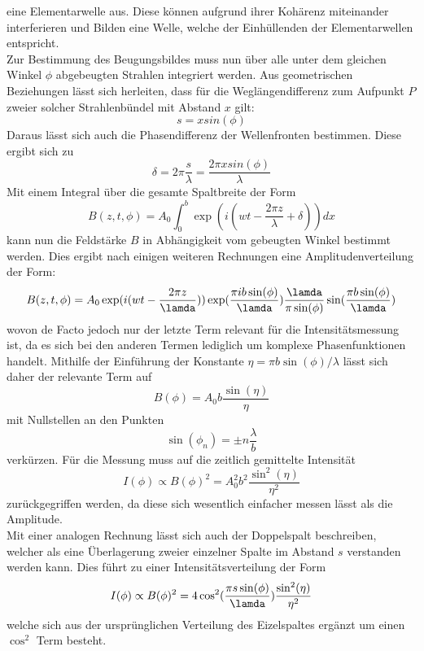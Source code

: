 eine Elementarwelle aus. Diese können aufgrund ihrer Kohärenz miteinander interferieren und Bilden eine Welle, welche der Einhüllenden der Elementarwellen 
entspricht. \\ Zur Bestimmung des Beugungsbildes muss nun über alle unter dem gleichen Winkel $\phi$ abgebeugten Strahlen 
integriert werden. Aus geometrischen Beziehungen lässt sich herleiten, dass für die Weglängendifferenz zum Aufpunkt $P$ zweier solcher Strahlenbündel mit Abstand $x$ gilt:
\begin{equation}
s=xsin(\phi)
\end{equation}
Daraus lässt sich auch die Phasendifferenz der Wellenfronten bestimmen. Diese ergibt sich zu
\begin{equation}
\delta=2\pi\frac{s}{\lambda}=\frac{2\pi xsin(\phi)}{\lambda}
\end{equation}
Mit einem Integral über die gesamte Spaltbreite der Form
\begin{equation}
B(z,t,\phi)=A_0 \int_{0}^{b} \exp(i(wt-\frac{2\pi z}{\lambda}+\delta))dx
\end{equation}
kann nun die Feldstärke $B$ in Abhängigkeit vom gebeugten Winkel bestimmt werden. Dies ergibt nach einigen weiteren Rechnungen eine 
Amplitudenverteilung der Form:
\begin{equation}
B(z,t,\phi)=A_0\exp(i(wt-\frac{2\pi z}{\lamda}))\exp(\frac{\pi ib\sin(\phi)}{\lamda})\frac{\lamda}{\pi \sin(\phi)}\sin(\frac{\pi b\sin(\phi)}{\lamda})
\end{equation}
wovon de Facto jedoch nur der letzte Term relevant für die Intensitätsmessung ist, da es sich bei den anderen
Termen lediglich um komplexe Phasenfunktionen handelt. Mithilfe der Einführung der Konstante $\eta=\pi b\sin(\phi)/\lambda$
lässt sich daher der relevante Term auf 
\begin{equation}
B(\phi)=A_0b\frac{\sin(\eta)}{\eta}
\end{equation}
mit Nullstellen an den Punkten
\begin{equation}
\sin(\phi_n)=\pm n\frac{\lambda}{b}
\end{equation}
verkürzen. Für die Messung muss auf die zeitlich gemittelte Intensität
\begin{equation}
    \label{eq:einfachspalt}
I(\phi)\propto B(\phi)^2=A_0^2b^2\frac{\sin^2(\eta)}{\eta^2}
\end{equation}
zurückgegriffen werden, da diese sich wesentlich einfacher messen lässt als die Amplitude. \\
Mit einer analogen Rechnung lässt sich auch der Doppelspalt beschreiben, welcher als eine Überlagerung zweier einzelner Spalte im Abstand $s$ verstanden
werden kann. Dies führt zu einer Intensitätsverteilung der Form
\begin{equation}
    \label{eq:doppelspalt}
I(\phi)\propto B(\phi)^2=4\cos^2(\frac{\pi s\sin(\phi)}{\lamda})\frac{\sin^2(\eta)}{\eta^2}
\end{equation}
welche sich aus der ursprünglichen Verteilung des Eizelspaltes ergänzt um einen $\cos^2$ Term besteht.


